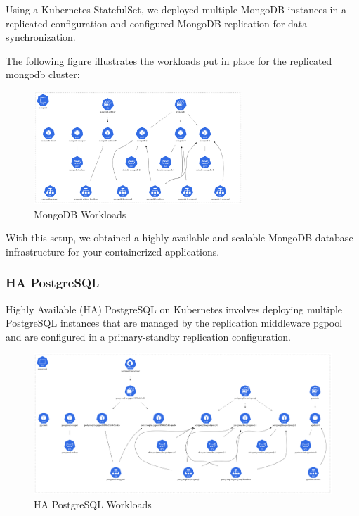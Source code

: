 Using a Kubernetes StatefulSet, we deployed multiple MongoDB instances in a replicated configuration and configured MongoDB replication for data synchronization.

The following figure illustrates the workloads put in place for the replicated mongodb cluster: 


\begin{figure}[H]\centering
\includegraphics[width=0.7\textwidth,angle=00]{assets/f36.png}
\caption{MongoDB Workloads }
\label{fig:MongoDB Workloads}
\end{figure}

With this setup, we obtained a highly available and scalable MongoDB database infrastructure for your containerized applications. 

\subsubsection{HA PostgreSQL }

Highly Available (HA) PostgreSQL on Kubernetes involves deploying multiple PostgreSQL instances that are managed by the replication middleware pgpool and are configured in a primary-standby replication configuration.

\begin{figure}[H]\centering
\includegraphics[width=1.0\textwidth,angle=00]{assets/f37.png}
\caption{HA PostgreSQL Workloads}
\label{fig:f37}
\end{figure}

